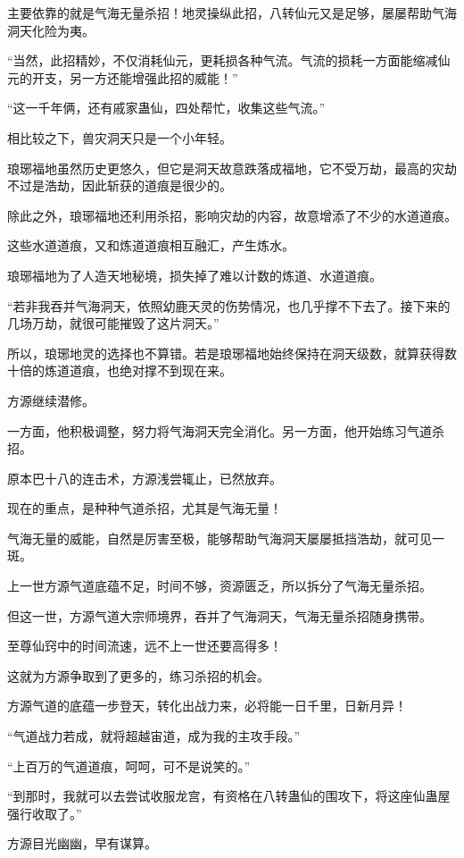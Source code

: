\begin{this_body}
主要依靠的就是气海无量杀招！地灵操纵此招，八转仙元又是足够，屡屡帮助气海洞天化险为夷。

“当然，此招精妙，不仅消耗仙元，更耗损各种气流。气流的损耗一方面能缩减仙元的开支，另一方还能增强此招的威能！”

“这一千年俩，还有戚家蛊仙，四处帮忙，收集这些气流。”

相比较之下，兽灾洞天只是一个小年轻。

琅琊福地虽然历史更悠久，但它是洞天故意跌落成福地，它不受万劫，最高的灾劫不过是浩劫，因此斩获的道痕是很少的。

除此之外，琅琊福地还利用杀招，影响灾劫的内容，故意增添了不少的水道道痕。

这些水道道痕，又和炼道道痕相互融汇，产生炼水。

琅琊福地为了人造天地秘境，损失掉了难以计数的炼道、水道道痕。

“若非我吞并气海洞天，依照幼鹿天灵的伤势情况，也几乎撑不下去了。接下来的几场万劫，就很可能摧毁了这片洞天。”

所以，琅琊地灵的选择也不算错。若是琅琊福地始终保持在洞天级数，就算获得数十倍的炼道道痕，也绝对撑不到现在来。

方源继续潜修。

一方面，他积极调整，努力将气海洞天完全消化。另一方面，他开始练习气道杀招。

原本巴十八的连击术，方源浅尝辄止，已然放弃。

现在的重点，是种种气道杀招，尤其是气海无量！

气海无量的威能，自然是厉害至极，能够帮助气海洞天屡屡抵挡浩劫，就可见一斑。

上一世方源气道底蕴不足，时间不够，资源匮乏，所以拆分了气海无量杀招。

但这一世，方源气道大宗师境界，吞并了气海洞天，气海无量杀招随身携带。

至尊仙窍中的时间流速，远不上一世还要高得多！

这就为方源争取到了更多的，练习杀招的机会。

方源气道的底蕴一步登天，转化出战力来，必将能一日千里，日新月异！

“气道战力若成，就将超越宙道，成为我的主攻手段。”

“上百万的气道道痕，呵呵，可不是说笑的。”

“到那时，我就可以去尝试收服龙宫，有资格在八转蛊仙的围攻下，将这座仙蛊屋强行收取了。”

方源目光幽幽，早有谋算。

\end{this_body}

